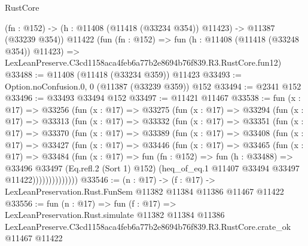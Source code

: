 \begin{lexlean}{RustCore}
\begin{coremodule}
    (fn : @152) -> (h : @11408 (@11418 (@33234 @354)) @11423) -> @11387 (@33239 @354))
    @11422
    (fun (fn : @152) =>
    fun (h : @11408 (@11418 (@33248 @354)) @11423) =>
    LexLeanPreserve.C3cd1158aca4feb6a77b2e8694b76f839.R3.RustCore.fun12)
@33488 := @11408 (@11418 (@33234 @359)) @11423
@33493 := Option.noConfusion.{0, 0} (@11387 (@33239 @359)) @152
@33494 := @2341 @152
@33496 := @33493 @33494 @152
@33497 := @11421 @11467
@33538 := fun (x : @17) =>
  @33256
    (fun (x : @17) =>
    @33275
      (fun (x : @17) =>
      @33294
        (fun (x : @17) =>
        @33313
          (fun (x : @17) =>
          @33332
            (fun (x : @17) =>
            @33351
              (fun (x : @17) =>
              @33370
                (fun (x : @17) =>
                @33389
                  (fun (x : @17) =>
                  @33408
                    (fun (x : @17) =>
                    @33427
                      (fun (x : @17) =>
                      @33446
                        (fun (x : @17) =>
                        @33465
                          (fun (x : @17) =>
                          @33484
                            (fun (x : @17) =>
                            fun (fn : @152) =>
                            fun (h : @33488) =>
                            @33496
                              @33497
                              (Eq.refl.{2} (Sort 1) @152)
                              (heq_of_eq.{1} @11407 @33494 @33497 @11422))))))))))))))
@33546 := (n : @17) ->
  (f : @17) -> LexLeanPreservation.Rust.FunSem @11382 @11384 @11386 @11467 @11422
@33556 := fun (n : @17) =>
  fun (f : @17) =>
  LexLeanPreservation.Rust.simulate
    @11382
    @11384
    @11386
    LexLeanPreserve.C3cd1158aca4feb6a77b2e8694b76f839.R3.RustCore.crate_ok
    @11467
    @11422
\end{coremodule}
\end{lexlean}
